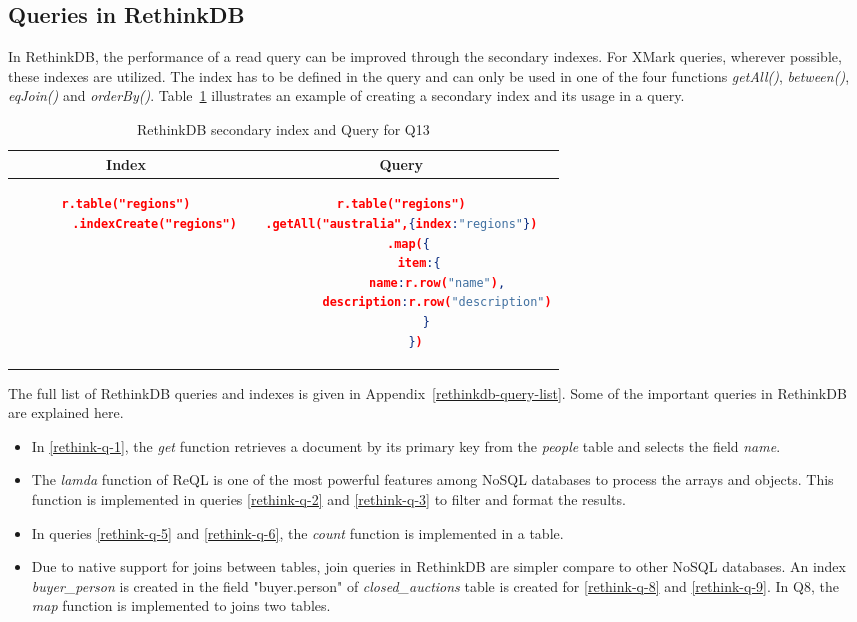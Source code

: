 \subsection{Queries in RethinkDB}

In RethinkDB, the performance of a read query can be improved through the secondary indexes. For XMark queries,  wherever possible, these indexes are utilized. The index has to be defined in the query and can only be used in one of the four functions \textit{getAll()}, \textit{between()}, \textit{eqJoin()} and \textit{orderBy()}. Table~\ref{tbl:rethinkdb-index-query} illustrates an example of creating a secondary index and its usage in a query.
\begin{longtable}{c|c}
	\caption{ RethinkDB secondary index and Query for Q13}
	\label{tbl:rethinkdb-index-query}\\
    {Index} & {Query}\\
	\hline
\begin{minipage}{.3\textwidth}
\begin{lstlisting}[language=JSON,basicstyle=\scriptsize]
    r.table("regions")
        .indexCreate("regions")
\end{lstlisting}
\end{minipage} &
\begin{minipage}{.5\textwidth}
\begin{lstlisting}[language=JSON,basicstyle=\scriptsize]
r.table("regions")
.getAll("australia",{index:"regions"})
    .map({  
       item:{  
          name:r.row("name"),
          description:r.row("description")
       }
    })
\end{lstlisting}
\end{minipage}
\end{longtable}
The full list of RethinkDB queries and indexes is given in Appendix~\ref{rethinkdb-query-list}. 
Some of the important queries in RethinkDB are explained here.

\begin{itemize}
\item  In \ref{rethink-q-1}, the \textit{get} function retrieves a document by its primary key from the \textit{people} table and selects the field \textit{name}.   

\item  The \textit{lamda} function of ReQL is one of the most powerful features among NoSQL databases to process the arrays and objects. This function is implemented in  queries \ref{rethink-q-2} and \ref{rethink-q-3} to filter and format the results. 

\item 
 In queries \ref{rethink-q-5} and \ref{rethink-q-6}, the \textit{count} function is implemented in a table. 
  \item Due to native support for joins between tables, join queries in RethinkDB are simpler compare to other NoSQL databases. An index \textit{buyer\_person} is created in the field "buyer.person" of \textit{closed\_auctions} table is created for \ref{rethink-q-8} and \ref{rethink-q-9}. In Q8, the \textit{map} function is implemented to joins two tables.

\end{itemize}

